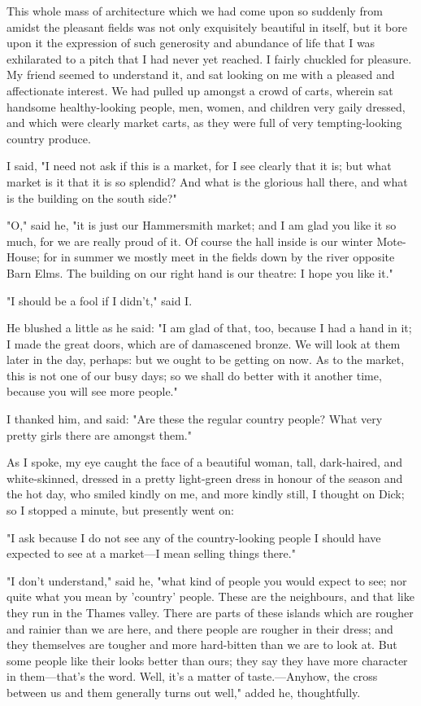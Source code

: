 This whole mass of architecture which we had come upon so suddenly from
amidst the pleasant fields was not only exquisitely beautiful in itself,
but it bore upon it the expression of such generosity and abundance of
life that I was exhilarated to a pitch that I had never yet reached. I
fairly chuckled for pleasure. My friend seemed to understand it, and sat
looking on me with a pleased and affectionate interest. We had pulled up
amongst a crowd of carts, wherein sat handsome healthy-looking people,
men, women, and children very gaily dressed, and which were clearly
market carts, as they were full of very tempting-looking country
produce.

I said, "I need not ask if this is a market, for I see clearly that it
is; but what market is it that it is so splendid? And what is the
glorious hall there, and what is the building on the south side?"

"O," said he, "it is just our Hammersmith market; and I am glad you like
it so much, for we are really proud of it. Of course the hall inside is
our winter Mote-House; for in summer we mostly meet in the fields down
by the river opposite Barn Elms. The building on our right hand is our
theatre: I hope you like it."

"I should be a fool if I didn't," said I.

He blushed a little as he said: "I am glad of that, too, because I had a
hand in it; I made the great doors, which are of damascened bronze. We
will look at them later in the day, perhaps: but we ought to be getting
on now. As to the market, this is not one of our busy days; so we shall
do better with it another time, because you will see more people."

I thanked him, and said: "Are these the regular country people? What
very pretty girls there are amongst them."

As I spoke, my eye caught the face of a beautiful woman, tall,
dark-haired, and white-skinned, dressed in a pretty light-green dress in
honour of the season and the hot day, who smiled kindly on me, and more
kindly still, I thought on Dick; so I stopped a minute, but presently
went on:

"I ask because I do not see any of the country-looking people I should
have expected to see at a market---I mean selling things there."

"I don't understand," said he, "what kind of people you would expect to
see; nor quite what you mean by 'country' people. These are the
neighbours, and that like they run in the Thames valley. There are parts
of these islands which are rougher and rainier than we are here, and
there people are rougher in their dress; and they themselves are tougher
and more hard-bitten than we are to look at. But some people like their
looks better than ours; they say they have more character in
them---that's the word. Well, it's a matter of taste.---Anyhow, the
cross between us and them generally turns out well," added he,
thoughtfully.

